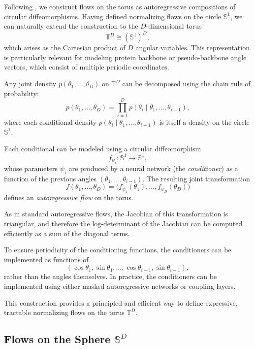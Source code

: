 \documentclass{article}
\begin{document}
Following \cite{Rezende2020}, we construct flows on the torus
as autoregressive compositions of circular diffeomorphisms.
Having defined normalizing flows on the circle $\mathbb{S}^1$, we can naturally extend the construction to the $D$-dimensional torus
\[
\mathbb{T}^D \cong (\mathbb{S}^1)^D ,
\]
which arises as the Cartesian product of $D$ angular variables. This representation is particularly relevant for modeling protein backbone or pseudo-backbone angle vectors, which consist of multiple periodic coordinates.

Any joint density $p(\theta_1, \ldots, \theta_D)$ on $\mathbb{T}^D$ can be decomposed using the chain rule of probability:
\begin{equation}
p(\theta_1, \ldots, \theta_D) = \prod_{i=1}^D p(\theta_i \mid \theta_1, \ldots, \theta_{i-1}),
\end{equation}
where each conditional density $p(\theta_i \mid \theta_1, \ldots, \theta_{i-1})$ is itself a density on the circle $\mathbb{S}^1$.

Each conditional can be modeled using a circular diffeomorphism
\[
f_{\psi_i} : \mathbb{S}^1 \to \mathbb{S}^1,
\]
whose parameters $\psi_i$ are produced by a neural network (the \emph{conditioner}) as a function of the previous angles $(\theta_1, \ldots, \theta_{i-1})$. The resulting joint transformation
\begin{equation}
f(\theta_1, \ldots, \theta_D) = \big( f_{\psi_1}(\theta_1), \ldots, f_{\psi_D}(\theta_D) \big)
\end{equation}
defines an \emph{autoregressive flow} on the torus.

As in standard autoregressive flows, the Jacobian of this transformation is triangular, and therefore the log-determinant of the Jacobian can be computed efficiently as a sum of the diagonal terms.

To ensure periodicity of the conditioning functions, the conditioners can be implemented as functions of
\[
(\cos \theta_1, \sin \theta_1, \ldots, \cos \theta_{i-1}, \sin \theta_{i-1}),
\]
rather than the angles themselves. In practice, the conditioners can be implemented using either masked autoregressive networks or coupling layers.

This construction provides a principled and efficient way to define expressive, tractable normalizing flows on the torus $\mathbb{T}^D$.

\subsection{Flows on the Sphere \texorpdfstring{$\mathbb{S}^D$}{SD}}
\label{sec:flows:sphere}
\end{document}

